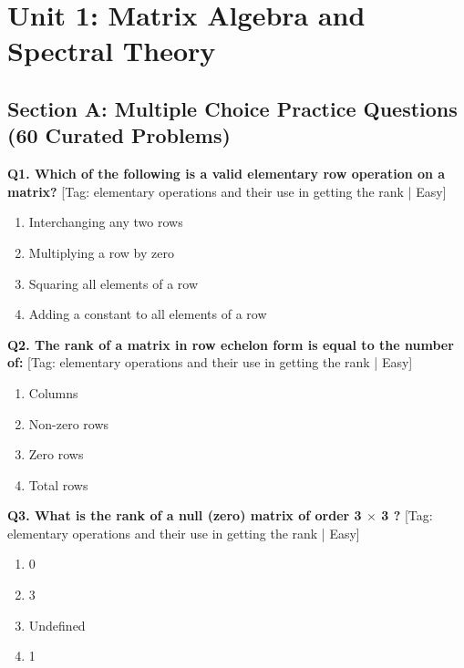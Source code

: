 \chapter{Unit 1: Matrix Algebra and Spectral Theory}

\section{Section A: Multiple Choice Practice Questions (60 Curated Problems)}

\noindent\textbf{Q1. Which of the following is a valid elementary row operation on a matrix?} \hfill [Tag: elementary operations and their use in getting the rank | Easy]
\begin{enumerate}[label=(\alph*),topsep=2pt,itemsep=1pt,partopsep=0pt,parsep=0pt]
    \item {{Interchanging any two rows}}
    \item {{Multiplying a row by zero}}
    \item {{Squaring all elements of a row}}
    \item {{Adding a constant to all elements of a row}}
\end{enumerate}
\vspace{2mm}

\noindent\textbf{Q2. The rank of a matrix in row echelon form is equal to the number of:} \hfill [Tag: elementary operations and their use in getting the rank | Easy]
\begin{enumerate}[label=(\alph*),topsep=2pt,itemsep=1pt,partopsep=0pt,parsep=0pt]
    \item {{Columns}}
    \item {{Non-zero rows}}
    \item {{Zero rows}}
    \item {{Total rows}}
\end{enumerate}
\vspace{2mm}

\noindent\textbf{Q3. What is the rank of a null (zero) matrix of order 3 $\times$ 3 ?} \hfill [Tag: elementary operations and their use in getting the rank | Easy]
\begin{enumerate}[label=(\alph*),topsep=2pt,itemsep=1pt,partopsep=0pt,parsep=0pt]
    \item {{0}}
    \item {{3}}
    \item {{Undefined}}
    \item {{1}}
\end{enumerate}
\vspace{2mm}

